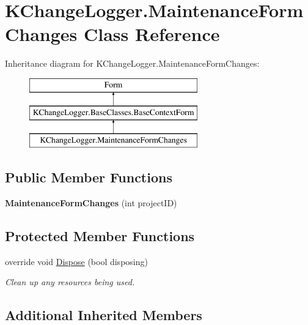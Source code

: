\hypertarget{class_k_change_logger_1_1_maintenance_form_changes}{\section{K\-Change\-Logger.\-Maintenance\-Form\-Changes Class Reference}
\label{class_k_change_logger_1_1_maintenance_form_changes}
}
Inheritance diagram for K\-Change\-Logger.\-Maintenance\-Form\-Changes\-:\begin{figure}[H]
\begin{center}
\leavevmode
\includegraphics[height=3.000000cm]{class_k_change_logger_1_1_maintenance_form_changes}
\end{center}
\end{figure}
\subsection*{Public Member Functions}
\begin{DoxyCompactItemize}
\item 
\hypertarget{class_k_change_logger_1_1_maintenance_form_changes_adab7830626c31ee9be5b487465dc5e83}{{\bfseries Maintenance\-Form\-Changes} (int project\-I\-D)}\label{class_k_change_logger_1_1_maintenance_form_changes_adab7830626c31ee9be5b487465dc5e83}

\end{DoxyCompactItemize}
\subsection*{Protected Member Functions}
\begin{DoxyCompactItemize}
\item 
override void \hyperlink{class_k_change_logger_1_1_maintenance_form_changes_a43e12fd28337a73bb8d80610630a099d}{Dispose} (bool disposing)
\begin{DoxyCompactList}\small\item\em Clean up any resources being used. \end{DoxyCompactList}\end{DoxyCompactItemize}
\subsection*{Additional Inherited Members}


